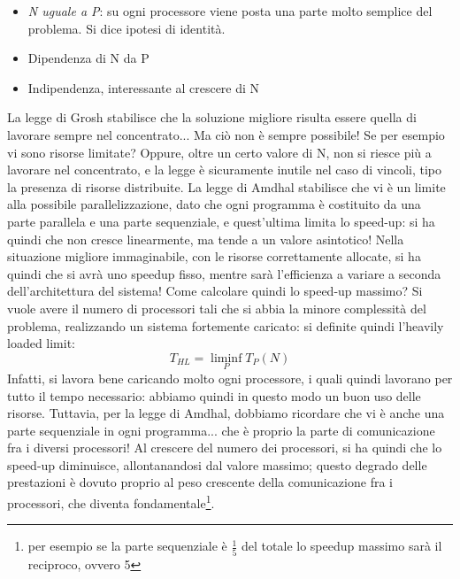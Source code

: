 \begin{itemize}
 \item \textit{N uguale a P}: su ogni processore viene posta una parte molto semplice del problema. Si dice ipotesi 
 di identità.
 \item Dipendenza di N da P
 \item Indipendenza, interessante al crescere di N
\end{itemize}
La legge di Grosh stabilisce che la soluzione migliore risulta essere quella di lavorare sempre nel concentrato... Ma
ciò non è sempre possibile! Se per esempio vi sono risorse limitate? Oppure, oltre un certo valore di N, non si riesce
più a lavorare nel concentrato, e la legge è sicuramente inutile nel caso di vincoli, tipo la presenza di risorse
distribuite.
La legge di Amdhal stabilisce che vi è un limite alla possibile parallelizzazione, dato che ogni programma è 
costituito da una parte parallela e una parte sequenziale, e quest'ultima limita lo speed-up: si ha quindi che non
cresce linearmente, ma tende a un valore asintotico! Nella situazione migliore immaginabile, con le risorse
correttamente allocate, si ha quindi che si avrà uno speedup fisso, mentre sarà l'efficienza a variare a seconda
dell'architettura del sistema!
Come calcolare quindi lo speed-up massimo? Si vuole avere il numero di processori tali che si abbia la minore
complessità del problema, realizzando un sistema fortemente caricato: si definite quindi l'heavily loaded limit:
\begin{equation}
 T_{HL} = \liminf_P{T_P(N)}
\end{equation}
Infatti, si lavora bene caricando molto ogni processore, i quali quindi lavorano per tutto il tempo necessario: 
abbiamo quindi in questo modo un buon uso delle risorse.
Tuttavia, per la legge di Amdhal, dobbiamo ricordare che vi è anche una parte sequenziale in ogni programma... che è
proprio la parte di comunicazione fra i diversi processori! Al crescere del numero dei processori, si ha quindi
che lo speed-up diminuisce, allontanandosi dal valore massimo; questo degrado delle prestazioni è dovuto proprio al 
peso crescente della comunicazione fra i processori, che diventa fondamentale\footnote{per esempio se la parte
sequenziale è $\frac{1}{5}$ del totale lo speedup massimo sarà il reciproco, ovvero 5}.
